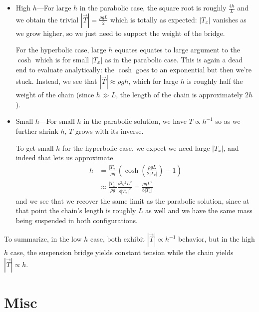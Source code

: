 \documentclass[12pt]{report}
\newcommand*{\abs}[1]{\left|#1\right|}
\begin{document}
\begin{itemize}
    \item High $h$---For large $h$ in the parabolic case, the square root is
        roughly $\frac{4h}{L}$ and we obtain the trivial $\abs{\vec{T}} =
        \frac{\rho g L}{2}$ which is totally as expected: $\abs{T_x}$ vanishes
        as we grow higher, so we just need to support the weight of the bridge.

        For the hyperbolic case, large $h$ equates equates to large argument to
        the $\cosh$ which is for small $\abs{T_x}$ as in the parabolic case.
        This is again a dead end to evaluate analytically: the $\cosh$ goes to
        an exponential but then we're stuck. Instead, we see that $\abs{\vec{T}}
        \approx \rho g h$, which for large $h$ is roughly half the weight of the
        chain (since $h \gg L$, the length of the chain is approximately $2h$).

    \item Small $h$---For small $h$ in the parabolic solution, we have $T
        \propto h^{-1}$ so as we further shrink $h$, $T$ grows with its inverse.

        To get small $h$ for the hyperbolic case, we expect we need large
        $\abs{T_x}$, and indeed that lets us approximate
        \begin{align*}
            h
                &= \frac{\abs{T_x}}{\rho g}
                    \left(
                        \cosh\left( \frac{\rho g L}{2\abs{T_x}} \right) - 1
                    \right)\\
                &\approx \frac{\abs{T_x}}{\rho g}
                    \frac{\rho^2 g^2 L^2}{8 \abs{T_x}^2}
                    = \frac{\rho g L^2}{8\abs{T_x}}
        \end{align*}
        and we see that we recover the same limit as the parabolic solution,
        since at that point the chain's length is roughly $L$ as well and we
        have the same mass being suspended in both configurations.
\end{itemize}

To summarize, in the low $h$ case, both exhibit $\abs{\vec{T}} \propto h^{-1}$
behavior, but in the high $h$ case, the suspension bridge yields constant
tension while the chain yields $\abs{\vec{T}} \propto h$.

\section{Misc}
\end{document}
